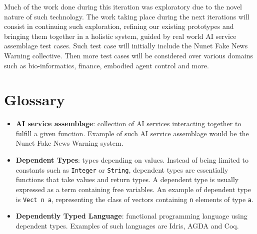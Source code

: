 \documentclass[]{report}
\begin{document}
Much of the work done during this iteration was exploratory due to the
novel nature of such technology.  The work taking place during the
next iterations will consist in continuing such exploration, refining
our existing prototypes and bringing them together in a holistic
system, guided by real world AI service assemblage test cases.  Such
test case will initially include the Nunet Fake News Warning
collective.  Then more test cases will be considered over various
domains such as bio-informatics, finance, embodied agent control and
more.

\appendix
\chapter{Glossary}
\begin{itemize}
\item \textbf{AI service assemblage}: collection of AI services
  interacting together to fulfill a given function.  Example of such
  AI service assemblage would be the Nunet Fake News Warning system.
\item \textbf{Dependent Types}: types depending on values.  Instead of
  being limited to constants such as \texttt{Integer} or
  \texttt{String}, dependent types are essentially functions that take
  values and return types.  A dependent type is usually expressed as a
  term containing free variables.  An example of dependent type is
  \texttt{Vect n a}, representing the class of vectors containing
  \texttt{n} elements of type \texttt{a}.
\item \textbf{Dependently Typed Language}: functional programming
  language using dependent types.  Examples of such languages are
  Idris, AGDA and Coq.
\end{itemize}



\end{document}
